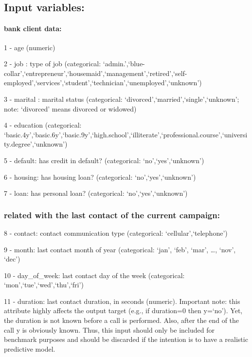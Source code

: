 \documentclass[8pt,onecolumn,aps,pra]{revtex4-1}
\begin{document}
    \hypertarget{input-variables}{%
\subsection{Input variables:}\label{input-variables}}

\hypertarget{bank-client-data}{%
\paragraph{bank client data:}\label{bank-client-data}}

1 - age (numeric)

2 - job : type of job (categorical:
`admin.',`blue-collar',`entrepreneur',`housemaid',`management',`retired',`self-employed',`services',`student',`technician',`unemployed',`unknown')

3 - marital : marital status (categorical:
`divorced',`married',`single',`unknown'; note: `divorced' means divorced
or widowed)

4 - education (categorical:
`basic.4y',`basic.6y',`basic.9y',`high.school',`illiterate',`professional.course',`university.degree',`unknown')

5 - default: has credit in default? (categorical: `no',`yes',`unknown')

6 - housing: has housing loan? (categorical: `no',`yes',`unknown')

7 - loan: has personal loan? (categorical: `no',`yes',`unknown')

\hypertarget{related-with-the-last-contact-of-the-current-campaign}{%
\subsubsection{related with the last contact of the current
campaign:}\label{related-with-the-last-contact-of-the-current-campaign}}

8 - contact: contact communication type (categorical:
`cellular',`telephone')

9 - month: last contact month of year (categorical: `jan', `feb', `mar',
\ldots{}, `nov', `dec')

10 - day\_of\_week: last contact day of the week (categorical:
`mon',`tue',`wed',`thu',`fri')

11 - duration: last contact duration, in seconds (numeric). Important
note: this attribute highly affects the output target (e.g., if
duration=0 then y=`no'). Yet, the duration is not known before a call is
performed. Also, after the end of the call y is obviously known. Thus,
this input should only be included for benchmark purposes and should be
discarded if the intention is to have a realistic predictive model.
\end{document}

